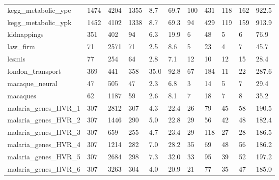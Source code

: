 \begin{longtable}{lllllllllll}
 kegg\_metabolic\_ype                                 & 1474       & 4204      & 1355  & 8.7    & 69.7   & 100   & 431    & 118    & 162    & 922.5   \\
 kegg\_metabolic\_ypk                                 & 1452       & 4102      & 1338  & 8.7    & 69.3   & 94    & 429    & 119    & 159    & 913.9   \\
 kidnappings                                        & 351        & 402       & 94    & 6.3    & 19.9   & 6     & 48     & 5      & 6      & 76.9    \\
 law\_firm                                           & 71         & 2571      & 71    & 2.5    & 8.6    & 5     & 23     & 4      & 7      & 45.7    \\
 lesmis                                             & 77         & 254       & 64    & 2.8    & 7.1    & 12    & 10     & 12     & 15     & 28.4    \\
 london\_transport                                   & 369        & 441       & 358   & 35.0   & 92.8   & 67    & 184    & 11     & 22     & 287.6   \\
 macaque\_neural                                     & 47         & 505       & 47    & 2.3    & 6.8    & 3     & 14     & 5      & 7      & 29.4    \\
 macaques                                           & 62         & 1187      & 59    & 2.6    & 8.1    & 7     & 18     & 7      & 8      & 35.2    \\
 malaria\_genes\_HVR\_1                                & 307        & 2812      & 307   & 4.3    & 22.4   & 26    & 79     & 45     & 58     & 190.5   \\
 malaria\_genes\_HVR\_2                                & 307        & 1446      & 290   & 5.0    & 22.8   & 29    & 56     & 42     & 48     & 182.4   \\
 malaria\_genes\_HVR\_3                                & 307        & 659       & 255   & 4.7    & 23.4   & 29    & 118    & 27     & 28     & 186.5   \\
 malaria\_genes\_HVR\_4                                & 307        & 1214      & 282   & 7.0    & 28.2   & 35    & 69     & 48     & 56     & 186.2   \\
 malaria\_genes\_HVR\_5                                & 307        & 2684      & 298   & 7.3    & 32.0   & 33    & 95     & 39     & 52     & 197.2   \\
 malaria\_genes\_HVR\_6                                & 307        & 3263      & 304   & 4.0    & 20.9   & 21    & 77     & 35     & 47     & 185.0   \\

\end{longtable}
